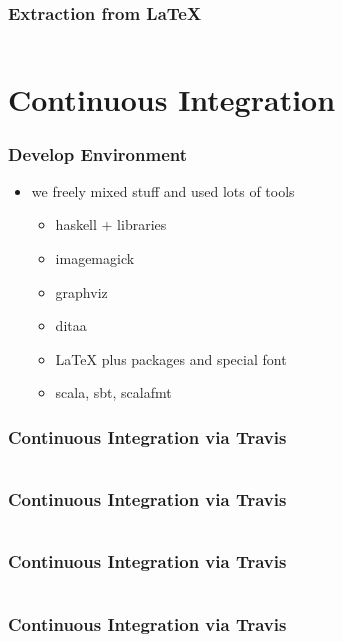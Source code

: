 \documentclass{beamer}
\begin{document}
\begin{frame}
  \frametitle{Extraction from LaTeX}
  \inputminted{haskell}{snippets/parse-latex.hs}
\end{frame}

\section{Continuous Integration}

\begin{frame}
  \frametitle{Develop Environment}
  \begin{itemize}
  \item we freely mixed stuff and used lots of tools
    \begin{itemize}
    \item haskell + libraries
    \item imagemagick
    \item graphviz
    \item ditaa
    \item LaTeX plus packages and special font
    \item scala, sbt, scalafmt
    \end{itemize}
  \end{itemize}
\end{frame}

\begin{frame}
  \frametitle{Continuous Integration via Travis}
  \inputminted[linenos=false, fontsize=\tiny, lastline=31]{yaml}{static-source/long-travis-ci.yml}
\end{frame}

\begin{frame}
  \frametitle{Continuous Integration via Travis}
  \inputminted[linenos=false, fontsize=\tiny, firstline=31, lastline=60]{yaml}{static-source/long-travis-ci.yml}
\end{frame}

\begin{frame}
  \frametitle{Continuous Integration via Travis}
  \inputminted[linenos=false, fontsize=\tiny, firstline=61, lastline=90]{yaml}{static-source/long-travis-ci.yml}
\end{frame}

\begin{frame}
  \frametitle{Continuous Integration via Travis}
  \inputminted[linenos=false, fontsize=\tiny, firstline=91, lastline=120]{yaml}{static-source/long-travis-ci.yml}
\end{frame}
\end{document}
